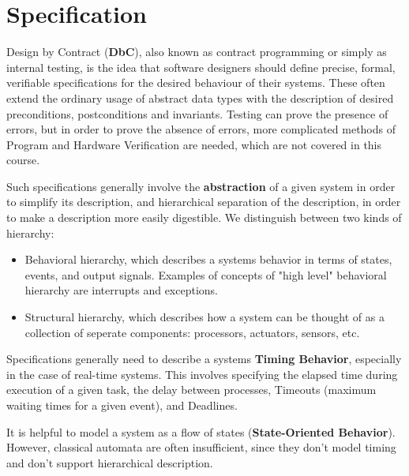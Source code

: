 \documentclass{report}
\newcommand{\tbf}{\textbf}
\newcommand*{\newpar}{\par\vspace{\baselineskip}\noindent} %
\begin{document}
\chapter{Specification}
\thispagestyle{fancy}
Design by Contract (\tbf{DbC}), also known as contract programming or simply as internal testing, is the idea that software designers should define precise, formal, verifiable specifications for the desired behaviour of their systems. These often extend the ordinary usage of abstract data types with the description of desired preconditions, postconditions and invariants. Testing can prove the presence of errors, but in order to prove the absence of errors, more complicated methods of Program and Hardware Verification are needed, which are not covered in this course.
\newpar
Such specifications generally involve the \tbf{abstraction} of a given system in order to simplify its description, and hierarchical separation of the description, in order to make a description more easily digestible. We distinguish between two kinds of hierarchy:
\begin{itemize}
    \item Behavioral hierarchy, which describes a systems behavior in terms of states, events, and output signals. Examples of concepts of "high level" behavioral hierarchy are interrupts and exceptions.
    \item Structural hierarchy, which describes how a system can be thought of as a collection of seperate components: processors, actuators, sensors, etc.
\end{itemize}
Specifications generally need to describe a systems \tbf{Timing Behavior}, especially in the case of real-time systems. This involves specifying the elapsed time during execution of a given task, the delay between processes, Timeouts (maximum waiting times for a given event), and Deadlines.
\newpar
It is helpful to model a system as a flow of states (\tbf{State-Oriented Behavior}). However, classical automata are often insufficient, since they don't model timing and don't support hierarchical description.
\end{document}
